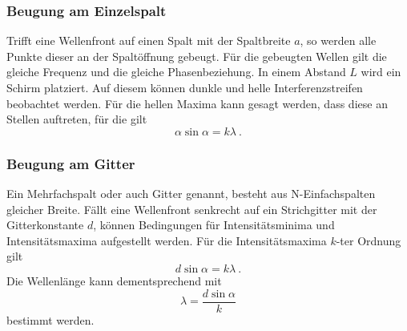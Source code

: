 \subsubsection{Beugung am Einzelspalt}
\label{sec:Beugung am Einzelspalt}

Trifft eine Wellenfront auf einen Spalt mit der Spaltbreite $a$, so werden alle Punkte dieser an der Spaltöffnung gebeugt.
Für die gebeugten Wellen gilt die gleiche Frequenz und die gleiche Phasenbeziehung. In einem Abstand $L$ wird ein 
Schirm platziert. Auf diesem können dunkle und helle Interferenzstreifen beobachtet werden. Für die hellen Maxima kann gesagt 
werden, dass diese an Stellen auftreten, für die gilt
\begin{equation}
    \alpha \sin \alpha = k \lambda\:.
\end{equation}

\subsubsection{ Beugung am Gitter}
\label{sec:Beugung am Gitter}

Ein Mehrfachspalt oder auch Gitter genannt, besteht aus N-Einfachspalten gleicher Breite. Fällt eine Wellenfront
senkrecht auf ein Strichgitter mit der Gitterkonstante $d$, können Bedingungen für Intensitätsminima und Intensitätsmaxima
aufgestellt werden.
Für die Intensitätsmaxima $k$-ter Ordnung gilt
\begin{equation}
    d \sin \alpha = k \lambda\:.
\end{equation}
Die Wellenlänge kann dementsprechend mit 
\begin{equation}
     \lambda = \frac{d \sin \alpha}{k}
     \label{eqn:well}
\end{equation}
bestimmt werden.

